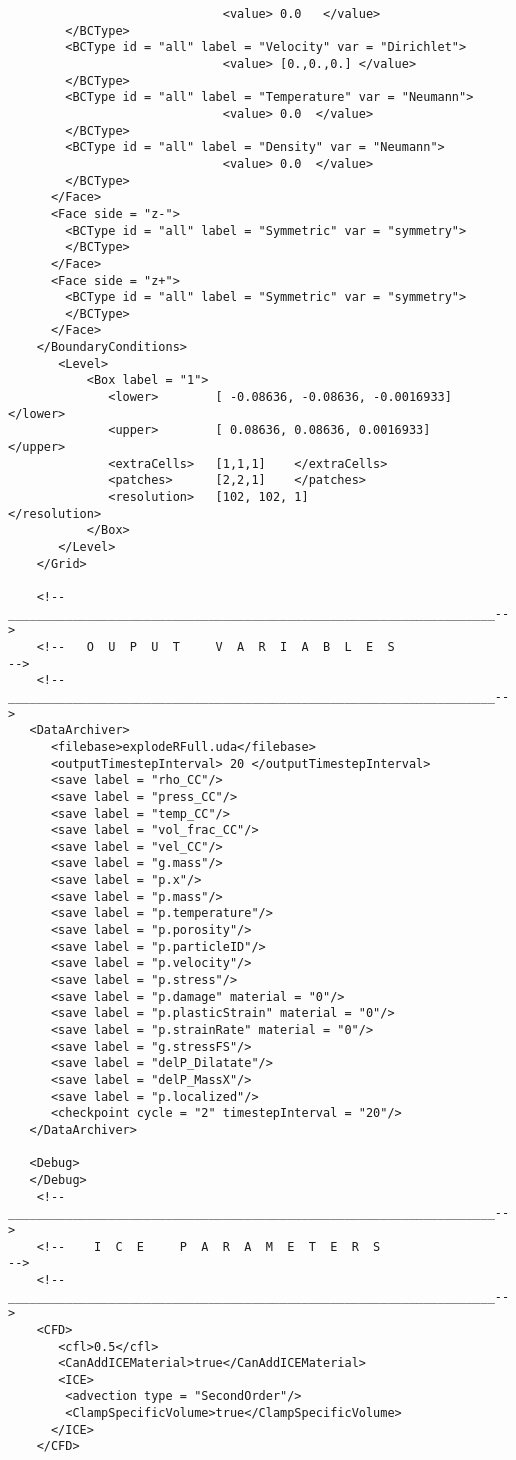 \begin{lstlisting}
                              <value> 0.0   </value>
        </BCType>
        <BCType id = "all" label = "Velocity" var = "Dirichlet">
                              <value> [0.,0.,0.] </value>
        </BCType>
        <BCType id = "all" label = "Temperature" var = "Neumann">
                              <value> 0.0  </value>
        </BCType>
        <BCType id = "all" label = "Density" var = "Neumann">
                              <value> 0.0  </value>
        </BCType>
      </Face>
      <Face side = "z-">
        <BCType id = "all" label = "Symmetric" var = "symmetry">
        </BCType>
      </Face>                  
      <Face side = "z+">
        <BCType id = "all" label = "Symmetric" var = "symmetry">
        </BCType>
      </Face>
    </BoundaryConditions>
       <Level>
           <Box label = "1">
              <lower>        [ -0.08636, -0.08636, -0.0016933] </lower>
              <upper>        [ 0.08636, 0.08636, 0.0016933]    </upper>
              <extraCells>   [1,1,1]    </extraCells>
              <patches>      [2,2,1]    </patches>
              <resolution>   [102, 102, 1]                 </resolution>
           </Box>
       </Level>
    </Grid>
   
    <!--____________________________________________________________________-->
    <!--   O  U  P  U  T     V  A  R  I  A  B  L  E  S                      -->
    <!--____________________________________________________________________-->
   <DataArchiver>
      <filebase>explodeRFull.uda</filebase>
      <outputTimestepInterval> 20 </outputTimestepInterval>
      <save label = "rho_CC"/>
      <save label = "press_CC"/>
      <save label = "temp_CC"/>
      <save label = "vol_frac_CC"/>
      <save label = "vel_CC"/>
      <save label = "g.mass"/>
      <save label = "p.x"/>
      <save label = "p.mass"/>
      <save label = "p.temperature"/>
      <save label = "p.porosity"/>
      <save label = "p.particleID"/>
      <save label = "p.velocity"/>
      <save label = "p.stress"/>
      <save label = "p.damage" material = "0"/>
      <save label = "p.plasticStrain" material = "0"/>
      <save label = "p.strainRate" material = "0"/>
      <save label = "g.stressFS"/>
      <save label = "delP_Dilatate"/>
      <save label = "delP_MassX"/>
      <save label = "p.localized"/>
      <checkpoint cycle = "2" timestepInterval = "20"/>
   </DataArchiver>

   <Debug>
   </Debug>
    <!--____________________________________________________________________-->
    <!--    I  C  E     P  A  R  A  M  E  T  E  R  S                        -->
    <!--____________________________________________________________________-->
    <CFD>
       <cfl>0.5</cfl>
       <CanAddICEMaterial>true</CanAddICEMaterial>
       <ICE>
        <advection type = "SecondOrder"/>
        <ClampSpecificVolume>true</ClampSpecificVolume>
      </ICE>        
    </CFD>


\end{lstlisting}
